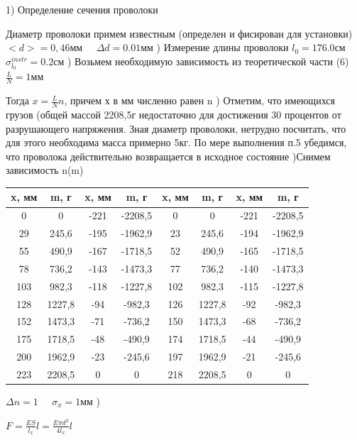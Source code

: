 \documentclass[12pt,a4paper]{article}
\begin{document}
1)\large \;\; Определение сечения проволоки 
\par
Диаметр проволоки примем известным (определен и фисирован для установки)\hfill \break
$<d>= 0,46\text{мм} \;\;\;\;\; \Delta{d} = 0.01\text{мм}$ 
\hfill {}) Измерение длины проволоки
\hfill \break
\hfill \break
$l_{0}=176.0\text{см}$ \;\;\;\;\;\;\;\;\;\;\;\;\;\;\;\;\;\;\; $\sigma^{instr}_{l_{0}}=0.2\text{см}$
\hfill \break
\hfill {}) Возьмем необходимую зависимость из теоретической части (6)
\hfill \break
\large $\frac{L}{N}=1\text{мм}$
\par Тогда $x = \frac{L}{N}n$, причем х в мм численно равен n
\hfill {}) Отметим, что имеющихся грузов (общей массой 2208,5г недостаточно для достижения 30 процентов от разрушающего напряжения. Зная диаметр проволоки, нетрудно посчитать, что для этого необходима масса примерно 5кг. По мере выполнения п.5 убедимся, что проволока действительно возвращается в исходное состояние 
\hfill \break
\hfill {})\;Снимем зависимость n(m)
\hfill \break
\hfill \break
\begin{tabular}{|c|c||c|c||c|c||c|c|}
\hline 
x, мм & m, г & x, мм & m, г & x, мм & m, г & x, мм & m, г \\ 
\hline 
0 & 0 & -221 & -2208,5 & 0 & 0 & -221 & -2208,5 \\ 
\hline 
29 & 245,6 & -195 & -1962,9 & 23 & 245,6 & -194 & -1962,9 \\ 
\hline 
55 & 490,9 & -167 & -1718,5 & 52 & 490,9 & -165 & -1718,5 \\ 
\hline 
78 & 736,2 & -143 & -1473,3 & 77 & 736,2 & -140 & -1473,3 \\ 
\hline 
103 & 982,3 & -118 & -1227,8 & 102 & 982,3 & -115 & -1227,8 \\ 
\hline 
128 & 1227,8 & -94 & -982,3 & 126 & 1227,8 & -92 & -982,3 \\ 
\hline 
152 & 1473,3 & -71 & -736,2 & 150 & 1473,3 & -68 & -736,2 \\ 
\hline 
175 & 1718,5 & -48 & -490,9 & 174 & 1718,5 & -44 & -490,9 \\ 
\hline 
200 & 1962,9 & -23 & -245,6 & 197 & 1962,9 & -21 & -245,6 \\ 
\hline 
223 & 2208,5 & 0 & 0 & 218 & 2208,5 & 0 & 0 \\ 
\hline 
\end{tabular} 
\hfill \break 
\hfill \break
$\Delta{n}=1 \;\;\;\;\; \sigma_{x} = 1 \text{мм}$
\hfill {})
\begin{center}
$F=\frac{ES}{l_{x}}l=\frac{E\pi{d^2}}{4l_{x}}l$ 
\end{center}
\end{document}
